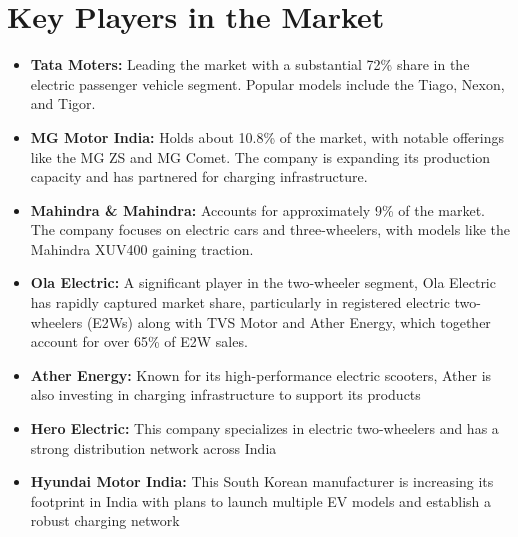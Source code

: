 \documentclass[a4paper,12pt]{report}
\begin{document}
\section{Key Players in the Market}
\begin{itemize}

    \item \textbf{Tata Moters:}
    Leading the market with a substantial 72\% share in the electric passenger vehicle segment. Popular models include the Tiago, Nexon, and Tigor.\cite{india_briefing}\cite{jmk_research}
    
    \item \textbf{MG Motor India:}
    Holds about 10.8\% of the market, with notable offerings like the MG ZS and MG Comet. The company is expanding its production capacity and has partnered for charging infrastructure.\cite{india_briefing}\cite{ibef}
    
    \item \textbf{Mahindra \& Mahindra:}
    Accounts for approximately 9\% of the market. The company focuses on electric cars and three-wheelers, with models like the Mahindra XUV400 gaining traction.\cite{india_briefing}\cite{jmk_research}
    
    \item \textbf{Ola Electric:}
    A significant player in the two-wheeler segment, Ola Electric has rapidly captured market share, particularly in registered electric two-wheelers (E2Ws) along with TVS Motor and Ather Energy, which together account for over 65\% of E2W sales.\cite{jmk_research}
    
    \item \textbf{Ather Energy:}
    Known for its high-performance electric scooters, Ather is also investing in charging infrastructure to support its products\cite{imarcgroup}\cite{ibef}
    
    \item \textbf{Hero Electric:}
    This company specializes in electric two-wheelers and has a strong distribution network across India\cite{imarcgroup}
    
    \item \textbf{Hyundai Motor India:}
    This South Korean manufacturer is increasing its footprint in India with plans to launch multiple EV models and establish a robust charging network\cite{india_briefing}\cite{ibef}
    
\end{itemize}
\end{document}
